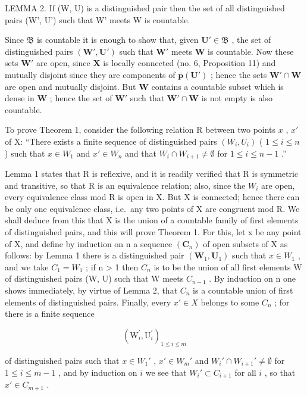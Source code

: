 LEMMA 2. If (W, U) is a distinguished pair then the set of all distinguished pairs (W', U') such that W' meets W is countable.

Since \(\mathfrak{B}\) is countable it is enough to show that, given \(\mathbf{U}' \in \mathfrak{B}\) , the set of distinguished pairs \((\mathbf{W}', \mathbf{U}')\) such that \(\mathbf{W}'\) meets \(\mathbf{W}\) is countable. Now these sets \(\mathbf{W}'\) are open, since \(\mathbf{X}\) is locally connected (no. 6, Proposition 11) and mutually disjoint since they are components of \(\overline{\boldsymbol{p}}(\mathbf{U}')\) ; hence the sets \(\mathbf{W}' \cap \mathbf{W}\) are open and mutually disjoint. But \(\mathbf{W}\) contains a countable subset which is dense in \(\mathbf{W}\) ; hence the set of \(\mathbf{W}'\) such that \(\mathbf{W}' \cap \mathbf{W}\) is not empty is also countable.

To prove Theorem 1, consider the following relation R between two points \(x\) , \(x'\) of X: ``There exists a finite sequence of distinguished pairs \((W_i, U_i)\) ( \(1 \leqslant i \leqslant n\) ) such that \(x \in W_1\) and \(x' \in W_n\) and that \(W_i \cap W_{i+1} \neq \emptyset\) for \(1 \leqslant i \leqslant n - 1\) .''

Lemma 1 states that R is reflexive, and it is readily verified that R is symmetric and transitive, so that R is an equivalence relation; also, since the \(W_{i}\) are open, every equivalence class mod R is open in X. But X is connected; hence there can be only one equivalence class, i.e.~any two points of X are congruent mod R. We shall deduce from this that X is the union of a countable family of first elements of distinguished pairs, and this will prove Theorem 1. For this, let x be any point of X, and define by induction on n a sequence \((\mathbf{C}_{n})\) of open subsets of X as follows: by Lemma 1 there is a distinguished pair \((\mathbf{W}_{1}, \mathbf{U}_{1})\) such that \(x \in W_{1}\) , and we take \(C_{1} = W_{1}\) ; if n \textgreater{} 1 then \(C_{n}\) is to be the union of all first elements W of distinguished pairs (W, U) such that W meets \(C_{n-1}\) . By induction on n one shows immediately, by virtue of Lemma 2, that \(C_{n}\) is a countable union of first elements of distinguished pairs. Finally, every \(x' \in X\) belongs to some \(C_{n}\) ; for there is a finite sequence

\[
\left(\mathrm{W} _ {i} ^ {\prime}, \mathrm{U} _ {i} ^ {\prime}\right) _ {1 \leqslant i \leqslant m}
\]

of distinguished pairs such that \(x \in W_1'\) , \(x' \in W_m'\) and \(W_i' \cap W_{i+1}' \neq \emptyset\) for \(1 \leqslant i \leqslant m - 1\) , and by induction on \(i\) we see that \(W_i' \subset C_{i+1}\) for all \(i\) , so that \(x' \in C_{m+1}\) .

